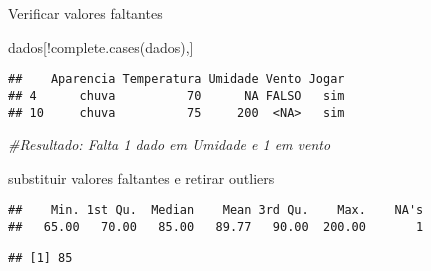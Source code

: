 \documentclass[
]{article}
\newenvironment{Shaded}{\begin{snugshade}}{\end{snugshade}}
\newcommand{\AttributeTok}[1]{\textcolor[rgb]{0.77,0.63,0.00}{#1}}
\newcommand{\CommentTok}[1]{\textcolor[rgb]{0.56,0.35,0.01}{\textit{#1}}}
\newcommand{\FunctionTok}[1]{\textcolor[rgb]{0.00,0.00,0.00}{#1}}
\newcommand{\NormalTok}[1]{#1}
\newcommand{\OtherTok}[1]{\textcolor[rgb]{0.56,0.35,0.01}{#1}}
\newcommand{\SpecialCharTok}[1]{\textcolor[rgb]{0.00,0.00,0.00}{#1}}
\begin{document}
Verificar valores faltantes

\begin{Shaded}
\begin{Highlighting}[]
\NormalTok{dados[}\SpecialCharTok{!}\FunctionTok{complete.cases}\NormalTok{(dados),]}
\end{Highlighting}
\end{Shaded}

\begin{verbatim}
##    Aparencia Temperatura Umidade Vento Jogar
## 4      chuva          70      NA FALSO   sim
## 10     chuva          75     200  <NA>   sim
\end{verbatim}

\begin{Shaded}
\begin{Highlighting}[]
\CommentTok{\#Resultado: Falta 1 dado em Umidade e 1 em vento}
\end{Highlighting}
\end{Shaded}

substituir valores faltantes e retirar outliers

\begin{Shaded}
\end{Shaded}

\begin{verbatim}
##    Min. 1st Qu.  Median    Mean 3rd Qu.    Max.    NA's 
##   65.00   70.00   85.00   89.77   90.00  200.00       1
\end{verbatim}

\begin{Shaded}
\end{Shaded}

\begin{verbatim}
## [1] 85
\end{verbatim}

\begin{Shaded}
\end{Shaded}
\end{document}
